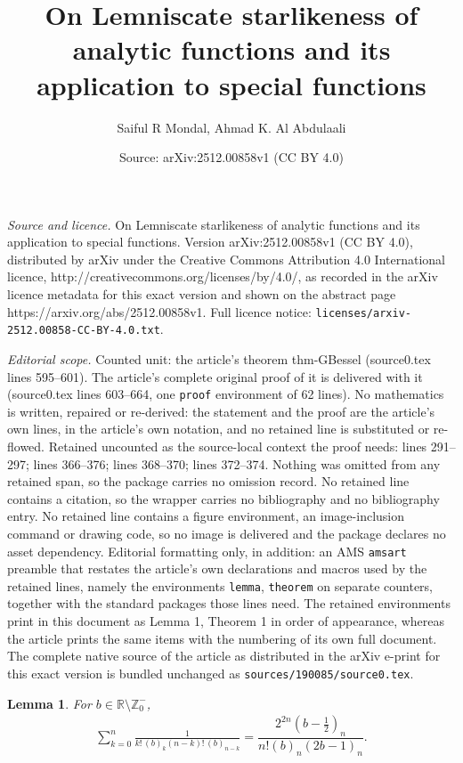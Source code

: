 \documentclass[10pt,a4paper]{amsart}
\title{On Lemniscate starlikeness of analytic functions and its application to special functions}
\author{Saiful R Mondal, Ahmad K. Al Abdulaali}
\date{Source: arXiv:2512.00858v1 (CC BY 4.0)}
\newtheorem{lemma}{Lemma}
\begin{document}
\maketitle

\noindent\emph{Source and licence.} On Lemniscate starlikeness of analytic functions and its application to special functions. Version arXiv:2512.00858v1 (CC BY 4.0), distributed by arXiv under the Creative Commons Attribution 4.0 International licence, http://creativecommons.org/licenses/by/4.0/, as recorded in the arXiv licence metadata for this exact version and shown on the abstract page https://arxiv.org/abs/2512.00858v1. Full licence notice: \texttt{licenses/arxiv-2512.00858-CC-BY-4.0.txt}.\par\smallskip

\noindent\textit{Editorial scope.} Counted unit: the article's theorem thm-GBessel (source0.tex lines 595--601). The article's complete original proof of it is delivered with it (source0.tex lines 603--664, one \texttt{proof} environment of 62 lines). No mathematics is written, repaired or re-derived: the statement and the proof are the article's own lines, in the article's own notation, and no retained line is substituted or re-flowed.  Retained uncounted as the source-local context the proof needs: lines 291--297; lines 366--376; lines 368--370; lines 372--374.  Nothing was omitted from any retained span, so the package carries no omission record.  No retained line contains a citation, so the wrapper carries no bibliography and no bibliography entry.  No retained line contains a figure environment, an image-inclusion command or drawing code, so no image is delivered and the package declares no asset dependency.  Editorial formatting only, in addition: an AMS \texttt{amsart} preamble that restates the article's own declarations and macros used by the retained lines, namely the environments \texttt{lemma}, \texttt{theorem} on separate counters, together with the standard packages those lines need.  The retained environments print in this document as Lemma 1, Theorem 1 in order of appearance, whereas the article prints the same items with the numbering of its own full document.  The complete native source of the article as distributed in the arXiv e-print for this exact version is bundled unchanged as \texttt{sources/190085/source0.tex}.
\begin{lemma}\label{lem:identity-1}
For  $b \in \mathbb{R}\setminus \mathbb{Z}_0^{-}$, 
\begin{align}\label{eqn-lem:identity-1}
    \sum_{k=0}^{n} \frac{1}{k!\,(b)_k (n-k)!\,(b)_{n-k}}= \dfrac{2^{2n} \left(b-\tfrac{1}{2}\right)_n}{n! (b)_n (2b-1)_n}.
\end{align}

\end{lemma}
\end{document}
